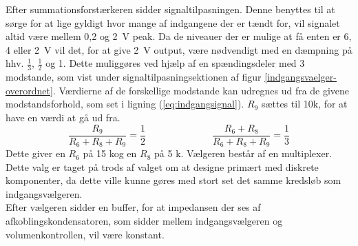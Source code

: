 Efter summationsforstærkeren sidder signaltilpasningen. Denne benyttes til at sørge for at lige gyldigt hvor mange af indgangene der er tændt for, vil signalet altid være mellem 0,2 og 2~V peak. Da de niveauer der er mulige at få enten er 6, 4 eller 2~V vil det, for at give 2~V output, være nødvendigt med en dæmpning på hhv. $\frac{1}{3}$, $\frac{1}{2}$ og 1. Dette muliggøres ved hjælp af en spændingsdeler med 3 modstande, som vist under signaltilpasningsektionen af figur \ref{indgangsvaelger-overordnet}. Værdierne af de forskellige modstande kan udregnes ud fra de givene modstandsforhold, som set i ligning (\ref{eq:indgangsignal}). $R_9$ sættes til 10k, for at have en værdi at gå ud fra.
\begin{equation}
\label{eq:indgangsignal}
\frac{R_9}{R_6+R_8+R_9}=\frac{1}{2} \;\;\;\;\;\;\;\;\;\;\;\;~~~~~~~~~~~~~~~~
\frac{R_6+R_8}{R_6+R_8+R_9}=\frac{1}{3}
\end{equation}
Dette giver en $R_6$ på 15 k\ohm  og en $R_8$ på 5 k\ohm.
Vælgeren består af en multiplexer. Dette valg er taget på trods af valget om at designe primært med diskrete komponenter, da dette ville kunne gøres med stort set det samme kredsløb som indgangsvælgeren. \\Efter vælgeren sidder en buffer, for at impedansen der ses af afkoblingskondensatoren, som sidder mellem indgangsvælgeren og volumenkontrollen, vil være konstant.